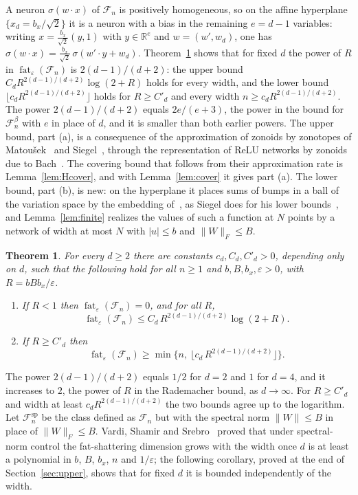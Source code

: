 \documentclass[11pt]{amsart}
\newtheorem{theorem}{Theorem}[section]
\theoremstyle{definition}
\theoremstyle{remark}
\numberwithin{equation}{section}
\newcommand{\RR}{\mathbb{R}}
\newcommand{\cF}{\mathcal{F}}
\newcommand{\fat}{\operatorname{fat}}
\begin{document}
A neuron $\sigma(w\cdot x)$ of $\cF_n$ is positively homogeneous, so on the affine hyperplane $\{x_d=b_x/\sqrt2\}$ it is a neuron with a bias in the remaining $e=d-1$ variables: writing $x=\frac{b_x}{\sqrt2}(y,1)$ with $y\in\RR^{e}$ and $w=(w',w_d)$, one has $\sigma(w\cdot x)=\frac{b_x}{\sqrt2}\,\sigma(w'\cdot y+w_d)$. Theorem~\ref{thm:main} shows that for fixed $d$ the power of $R$ in $\fat_\varepsilon(\cF_n)$ is $2(d-1)/(d+2)$: the upper bound $C_dR^{2(d-1)/(d+2)}\log(2+R)$ holds for every width, and the lower bound $\lfloor c_dR^{2(d-1)/(d+2)}\rfloor$ holds for $R\ge C'_d$ and every width $n\ge c_dR^{2(d-1)/(d+2)}$. The power $2(d-1)/(d+2)$ equals $2e/(e+3)$, the power in the bound for $\cF_n^{\beta}$ with $e$ in place of $d$, and it is smaller than both earlier powers. The upper bound, part (a), is a consequence of the approximation of zonoids by zonotopes of Matou\v{s}ek~\cite{Matousek} and Siegel~\cite[Theorem~1]{Siegel}, through the representation of ReLU networks by zonoids due to Bach~\cite{Bach}. The covering bound that follows from their approximation rate is Lemma~\ref{lem:Hcover}, and with Lemma~\ref{lem:cover} it gives part (a). The lower bound, part (b), is new: on the hyperplane it places sums of bumps in a ball of the variation space by the embedding of~\cite{MSX}, as Siegel does for his lower bounds~\cite[(1.23)]{Siegel}, and Lemma~\ref{lem:finite} realizes the values of such a function at $N$ points by a network of width at most $N$ with $|u|\le b$ and $\|W\|_F\le B$.

\begin{theorem}\label{thm:main}
For every $d\ge2$ there are constants $c_d,C_d,C'_d>0$, depending only on $d$, such that the following hold for all $n\ge1$ and $b,B,b_x,\varepsilon>0$, with $R=bBb_x/\varepsilon$.
\begin{enumerate}[label=(\alph*)]
\item If $R<1$ then $\fat_\varepsilon(\cF_n)=0$, and for all $R$,
\[
\fat_\varepsilon(\cF_n)\le C_d\,R^{2(d-1)/(d+2)}\log(2+R).
\]
\item If $R\ge C'_d$ then
\[
\fat_\varepsilon(\cF_n)\ge\min\bigl\{n,\ \lfloor c_d\,R^{2(d-1)/(d+2)}\rfloor\bigr\}.
\]
\end{enumerate}
\end{theorem}

The power $2(d-1)/(d+2)$ equals $1/2$ for $d=2$ and $1$ for $d=4$, and it increases to $2$, the power of $R$ in the Rademacher bound, as $d\to\infty$. For $R\ge C'_d$ and width at least $c_dR^{2(d-1)/(d+2)}$ the two bounds agree up to the logarithm. Let $\cF_n^{\mathrm{sp}}$ be the class defined as $\cF_n$ but with the spectral norm $\|W\|\le B$ in place of $\|W\|_F\le B$. Vardi, Shamir and Srebro~\cite[Theorem~1]{VSS} proved that under spectral-norm control the fat-shattering dimension grows with the width once $d$ is at least a polynomial in $b$, $B$, $b_x$, $n$ and $1/\varepsilon$; the following corollary, proved at the end of Section~\ref{sec:upper}, shows that for fixed $d$ it is bounded independently of the width.
\end{document}
